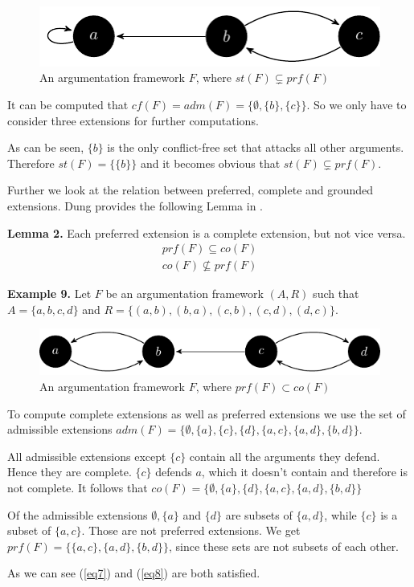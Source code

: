 \documentclass[draft,final]{vutinfth} %
\newcommand{\hl}{\par\vspace{6pt}} %
\newcommand{\cl}{\par\vspace{12pt}} %
\begin{document}
\FloatBarrier
	\begin{figure}[!h]
		\centering

		\includegraphics[width=\linewidth]{graphs/ex2_v2.pdf}
		\caption{An argumentation framework $F$, where $st(F)\subsetneq prf(F)$}
	\end{figure}
\FloatBarrier

It can be computed that $cf(F)=adm(F)=\{\emptyset,\{b\},\{c\}\}$. So we only have to consider three extensions for further computations.\hl
As can be seen, $\{b\}$ is the only conflict-free set that attacks all other arguments. Therefore $st(F)=\{\{b\}\}$ and it becomes obvious that $st(F)\subsetneq prf(F)$.\cl

Further we look at the relation between preferred, complete and grounded extensions. Dung provides the following Lemma in \cite{Dung}.\hl

\textbf{Lemma 2.}
Each preferred extension is a complete extension, but not vice versa.
\begin{align}
	\label{eq7} prf(F)\subseteq co(F) \\ 
	\label{eq8} co(F)\not\subseteq prf(F) 
\end{align}\hl

\textbf{Example 9.} Let $F$ be an argumentation framework $(A,R)$ such that $A=\{a,b,c,d\}$ and $R=\{(a,b),(b,a),(c,b),(c,d),(d,c)\}$.\hl

\FloatBarrier
	\begin{figure}[!h]
		\centering
		\includegraphics[width=\linewidth]{graphs/ex3.pdf}
		\caption{An argumentation framework $F$, where $prf(F)\subset co(F)$}
	\end{figure}
\FloatBarrier

To compute complete extensions as well as preferred extensions we use the set of admissible extensions $adm(F)=\{\emptyset,\{a\},\{c\},\{d\},\{a,c\},\{a,d\},\{b,d\}\}$.\hl
All admissible extensions except $\{c\}$ contain all the arguments they defend. Hence they are complete. $\{c\}$ defends $a$, which it doesn't contain and therefore is not complete. It follows that $co(F)=\{\emptyset,\{a\},\{d\},\{a,c\},\{a,d\},\{b,d\}\}$\hl
Of the admissible extensions $\emptyset,\{a\}$ and $\{d\}$ are subsets of $\{a,d\}$, while $\{c\}$ is a subset of $\{a,c\}$. Those are not preferred extensions. We get $prf(F)=\{\{a,c\},\{a,d\},\{b,d\}\}$, since these sets are not subsets of each other.\hl
As we can see (\ref{eq7}) and (\ref{eq8}) are both satisfied.\cl
\end{document}
